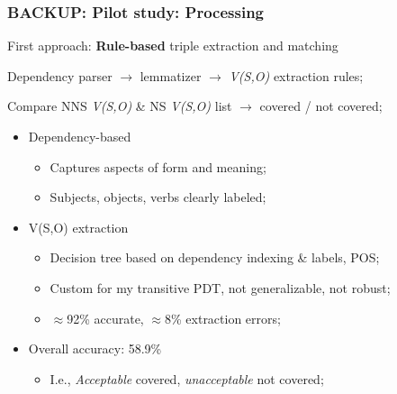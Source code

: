 \documentclass[handout,xcolor={dvipsnames}]{beamer}
\begin{document}
\begin{frame}
\frametitle{BACKUP: Pilot study: Processing}

First approach: \textbf{Rule-based} triple extraction and matching

\medskip
\pause
Dependency parser $\rightarrow$ lemmatizer $\rightarrow$ \textit{V(S,O)} extraction rules;

\pause
\medskip
Compare NNS \textit{V(S,O)} \& NS \textit{V(S,O)} list $\rightarrow$ covered / not covered;
\pause

\begin{itemize}
\pause
\item Dependency-based
\begin{itemize}
\pause
\item Captures aspects of form and meaning;
\pause
\item Subjects, objects, verbs clearly labeled;
\end{itemize}
\pause
\item V(S,O) extraction
\begin{itemize}
\pause
\item Decision tree based on dependency indexing \& labels, POS;
\pause
\item Custom for my transitive PDT, not generalizable, not robust;
\pause
\item $\approx$92\% accurate, $\approx$8\% extraction errors;
\end{itemize}
\pause
\item Overall accuracy: 58.9\%
\pause
\begin{itemize}
\pause
\item I.e., \textit{Acceptable} covered, \textit{unacceptable} not covered;
\end{itemize}
\end{itemize}
\end{frame}
\end{document}

